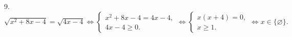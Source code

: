 9. $\sqrt{x^2+8x-4}=\sqrt{4x-4}\Leftrightarrow\begin{cases} x^2+8x-4=4x-4,\\ 4x-4\geqslant0.\end{cases}
\Leftrightarrow\begin{cases} x(x+4)=0,\\ x\geqslant1.\end{cases}\Leftrightarrow x\in\{\varnothing\}.$\\
